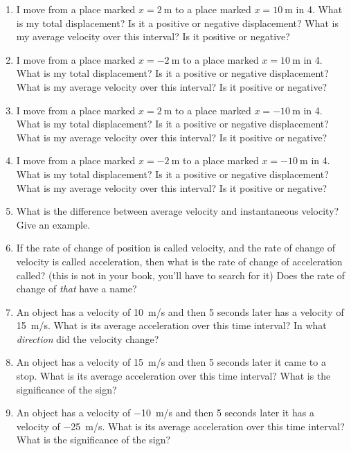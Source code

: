 \begin{enumerate}
\setlength\itemsep{1 in}

\item I move from a place marked $x=\SI{2}{\meter}$ to a place marked $x=\SI{10}{\meter}$ in \SI{4}{\sec}. What is my total displacement? Is it a positive or negative displacement? What is my average velocity over this interval? Is it positive or negative?
\item I move from a place marked $x=\SI{-2}{\meter}$ to a place marked $x=\SI{10}{\meter}$ in \SI{4}{\sec}. What is my total displacement? Is it a positive or negative displacement? What is my average velocity over this interval? Is it positive or negative?
\item I move from a place marked $x=\SI{2}{\meter}$ to a place marked $x=\SI{-10}{\meter}$ in \SI{4}{\sec}. What is my total displacement? Is it a positive or negative displacement? What is my average velocity over this interval? Is it positive or negative?
\item I move from a place marked $x=\SI{-2}{\meter}$ to a place marked $x=\SI{-10}{\meter}$ in \SI{4}{\sec}. What is my total displacement? Is it a positive or negative displacement? What is my average velocity over this interval? Is it positive or negative?

\item What is the difference between average velocity and instantaneous velocity? Give an example.

\item If the rate of change of position is called velocity, and the rate of change of velocity is called acceleration, then what is the rate of change of acceleration called? (this is not in your book, you'll have to search for it) Does the rate of change of \emph{that} have a name?

\item An object has a velocity of \SI{10}{m/s} and then 5 seconds later has a velocity of \SI{15}{m/s}. What is its average acceleration over this time interval? In what \emph{direction} did the velocity change?
\item An object has a velocity of \SI{15}{m/s} and then 5 seconds later it came to a stop. What is its average acceleration over this time interval? What is the significance of the sign?
\item An object has a velocity of \SI{-10}{m/s} and then 5 seconds later it has a velocity of \SI{-25}{m/s}. What is its average acceleration over this time interval? What is the significance of the sign?


\end{enumerate}

